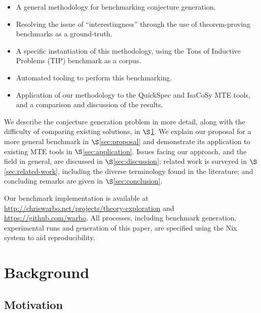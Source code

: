 \begin{itemize}
\item A general methodology for benchmarking conjecture generation.
\item Resolving the issue of ``interestingness'' through the use of
  theorem-proving benchmarks as a ground-truth.
\item A specific instantiation of this methodology, using the Tons of Inductive
  Problems (TIP) benchmark as a corpus.
\item Automated tooling to perform this benchmarking.
\item Application of our methodology to the QuickSpec and IsaCoSy MTE tools,
  and a comparison and discussion of the results.
\end{itemize}

We describe the conjecture generation problem in more detail, along with the
difficulty of comparing existing solutions, in $\S$\ref{sec:background}. We
explain our proposal for a more general benchmark in $\S$\ref{sec:proposal} and
demonstrate its application to existing MTE tools in $\S$\ref{sec:application}.
Issues facing our approach, and the field in general, are discussed in
$\S$\ref{sec:discussion}; related work is surveyed in
$\S$\ref{sec:related-work}, including the diverse terminology found in the
literature; and concluding remarks are given in $\S$\ref{sec:conclusion}.

\begin{sloppypar}
  Our benchmark implementation is available at
  \url{http://chriswarbo.net/projects/theory-exploration} and
  \url{https://github.com/warbo}. All processes, including benchmark generation,
  experimental runs and generation of this paper, are specified using the
  Nix~\cite{dolstra2004nix} system to aid reproducibility.
\end{sloppypar}

\section{Background}
\label{sec:background}

\subsection{Motivation}
\label{sec:motivation}

